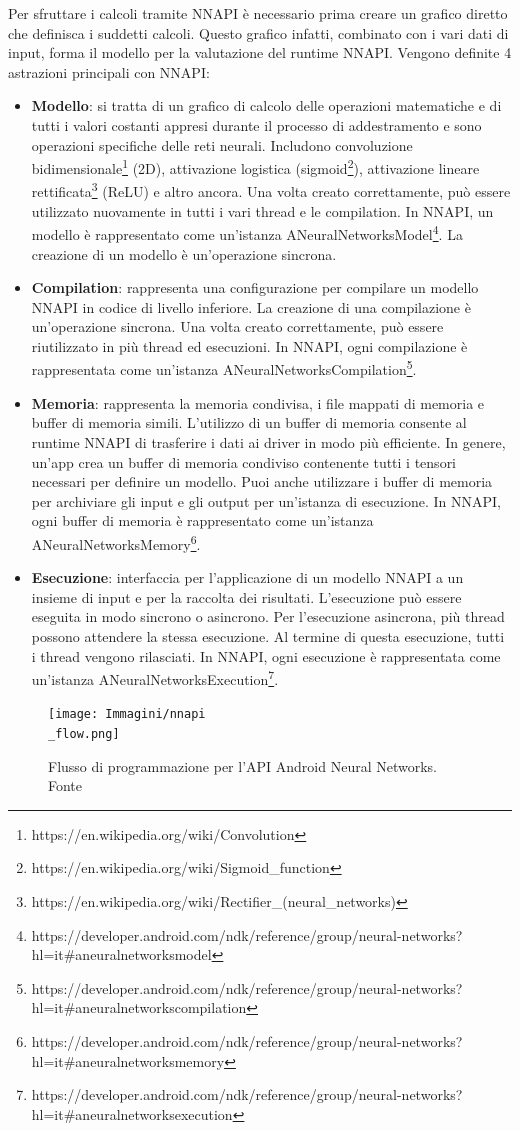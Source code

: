 Per sfruttare i calcoli tramite NNAPI è necessario prima creare un grafico diretto che definisca i suddetti calcoli. Questo grafico infatti, combinato con
i vari dati di input, forma il modello per la valutazione del runtime NNAPI. Vengono definite 4 astrazioni principali con NNAPI:
\begin{itemize}
    \item \textbf{Modello}: si tratta di un grafico di calcolo delle operazioni matematiche e di tutti i valori costanti appresi durante il processo
    di addestramento e sono operazioni specifiche delle reti neurali. Includono convoluzione bidimensionale\footnote{https://en.wikipedia.org/wiki/Convolution}
    (2D), attivazione logistica (sigmoid\footnote{https://en.wikipedia.org/wiki/Sigmoid\_function}), attivazione lineare rettificata\footnote{https://en.wikipedia.org/wiki/Rectifier\_(neural\_networks)}
    (ReLU) e altro ancora. Una volta creato correttamente, può essere utilizzato nuovamente in tutti i vari thread e le compilation. In NNAPI, un modello
    è rappresentato come un'istanza ANeuralNetworksModel\footnote{https://developer.android.com/ndk/reference/group/neural-networks?hl=it\#aneuralnetworksmodel}.
    La creazione di un modello è un'operazione sincrona.
    \item \textbf{Compilation}: rappresenta una configurazione per compilare un modello NNAPI in codice di livello inferiore. La creazione di una
    compilazione è un'operazione sincrona. Una volta creato correttamente, può essere riutilizzato in più thread ed esecuzioni. In NNAPI, ogni
    compilazione è rappresentata come un'istanza ANeuralNetworksCompilation\footnote{https://developer.android.com/ndk/reference/group/neural-networks?hl=it\#aneuralnetworkscompilation}.
    \item \textbf{Memoria}: rappresenta la memoria condivisa, i file mappati di memoria e buffer di memoria simili. L'utilizzo di un buffer di memoria
    consente al runtime NNAPI di trasferire i dati ai driver in modo più efficiente. In genere, un'app crea un buffer di memoria condiviso contenente
    tutti i tensori necessari per definire un modello. Puoi anche utilizzare i buffer di memoria per archiviare gli input e gli output per un'istanza di
    esecuzione. In NNAPI, ogni buffer di memoria è rappresentato come un'istanza ANeuralNetworksMemory\footnote{https://developer.android.com/ndk/reference/group/neural-networks?hl=it\#aneuralnetworksmemory}.
    \item \textbf{Esecuzione}: interfaccia per l'applicazione di un modello NNAPI a un insieme di input e per la raccolta dei risultati. L'esecuzione
    può essere eseguita in modo sincrono o asincrono. Per l'esecuzione asincrona, più thread possono attendere la stessa esecuzione. Al termine di questa
    esecuzione, tutti i thread vengono rilasciati. In NNAPI, ogni esecuzione è rappresentata come un'istanza ANeuralNetworksExecution\footnote{https://developer.android.com/ndk/reference/group/neural-networks?hl=it\#aneuralnetworksexecution}.
\end{itemize}

\begin{figure}
    \centering
    \texttt{[image: Immagini/nnapi\\\_flow.png]}
    \caption{Flusso di programmazione per l'API Android Neural Networks. Fonte \cite{NNAPI}}
    \label{}
\end{figure}




